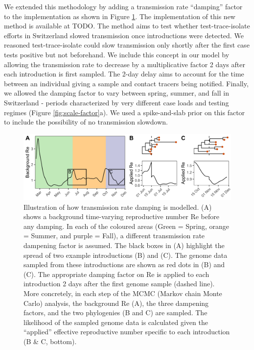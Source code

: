 \documentclass[11pt,twoside,lineno]{pnas-new} %
\begin{document}
We extended this methodology by adding a transmission rate ``damping'' factor to the implementation as shown in Figure \ref{fig:phylo-methods}. The implementation of this new method is available at TODO. The method aims to test whether test-trace-isolate efforts in Switzerland slowed transmission once introductions were detected. We reasoned test-trace-isolate could slow transmission only shortly after the first case tests positive but not beforehand. We include this concept in our model by allowing the transmission rate to decrease by a multiplicative factor 2 days after each introduction is first sampled. The 2-day delay aims to account for the time between an individual giving a sample and contact tracers being notified. Finally, we allowed the damping factor to vary between spring, summer, and fall in Switzerland - periods characterized by very different case loads and testing regimes (Figure \ref{fig:scale-factor}a). We used a spike-and-slab prior on this factor to include the possibility of no transmission slowdown. 

\begin{figure}[h!]
\centering
\includegraphics[width=0.75\linewidth]{figures/phylodynamic_method_example.png}
\caption{Illustration of how transmission rate damping is modelled. (A) shows a background time-varying reproductive number Re before any damping. In each of the coloured areas (Green = Spring, orange = Summer, and purple = Fall), a different transmission rate dampening factor is assumed. The black boxes in (A) highlight the spread of two example introductions (B) and (C). The genome data sampled from these introductions are shown as red dots in (B) and (C). The appropriate damping factor on Re is applied to each introduction 2 days after the first genome sample (dashed line). More concretely, in each step of the MCMC (Markov chain Monte Carlo) analysis, the background Re (A), the three dampening factors, and the two phylogenies (B and C) are sampled. The likelihood of the sampled genome data is calculated given the ``applied'' effective reproductive number specific to each introduction (B \& C, bottom).}  
\label{fig:phylo-methods}
\end{figure}
\end{document}
